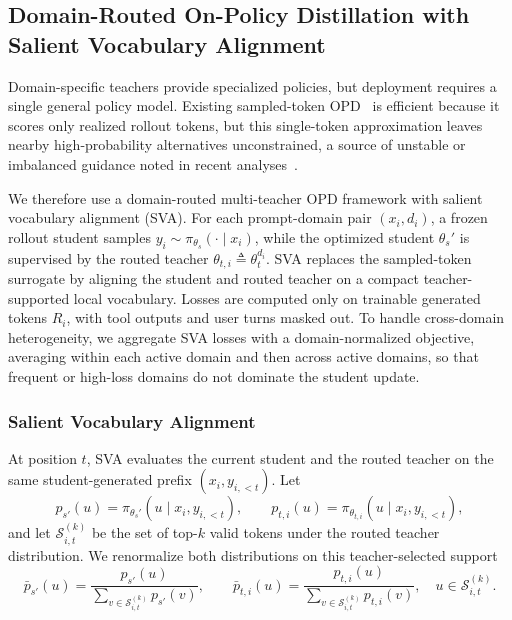 \documentclass{llmxive}
\begin{document}
\subsection{Domain-Routed On-Policy Distillation with Salient Vocabulary Alignment}
\label{subsec:on-policy-distillation}

Domain-specific teachers provide specialized policies, but deployment requires a single general policy model. Existing sampled-token OPD~\citep{lu2025onpolicydistillation} is efficient because it scores only realized rollout tokens, but this single-token approximation leaves nearby high-probability alternatives unconstrained, a source of unstable or imbalanced guidance noted in recent analyses~\citep{fu2026revisiting,deepseekai2026deepseekv4}.

We therefore use a domain-routed multi-teacher OPD framework with salient vocabulary alignment (SVA). For each prompt-domain pair $(x_i,d_i)$, a frozen rollout student samples $y_i\sim\pi_{\theta_s}(\cdot\mid x_i)$, while the optimized student $\theta_s'$ is supervised by the routed teacher $\theta_{t,i}\triangleq\theta_t^{d_i}$. SVA replaces the sampled-token surrogate by aligning the student and routed teacher on a compact teacher-supported local vocabulary. Losses are computed only on trainable generated tokens $R_i$, with tool outputs and user turns masked out. To handle cross-domain heterogeneity, we aggregate SVA losses with a domain-normalized objective, averaging within each active domain and then across active domains, so that frequent or high-loss domains do not dominate the student update.

\subsubsection{Salient Vocabulary Alignment}

At position $t$, SVA evaluates the current student and the routed teacher on the same student-generated prefix $(x_i,y_{i,<t})$. Let
\[
p_{s'}(u)=\pi_{\theta_s'}(u\mid x_i,y_{i,<t}),
\qquad
p_{t,i}(u)=\pi_{\theta_{t,i}}(u\mid x_i,y_{i,<t}),
\]
and let $\mathcal{S}_{i,t}^{(k)}$ be the set of top-$k$ valid tokens under the routed teacher distribution. We renormalize both distributions on this teacher-selected support
\[
\bar p_{s'}(u)
=
\frac{p_{s'}(u)}
{\sum_{v\in\mathcal{S}_{i,t}^{(k)}}p_{s'}(v)},
\qquad
\bar p_{t,i}(u)
=
\frac{p_{t,i}(u)}
{\sum_{v\in\mathcal{S}_{i,t}^{(k)}}p_{t,i}(v)},
\quad
u\in\mathcal{S}_{i,t}^{(k)}.
\]
\end{document}
